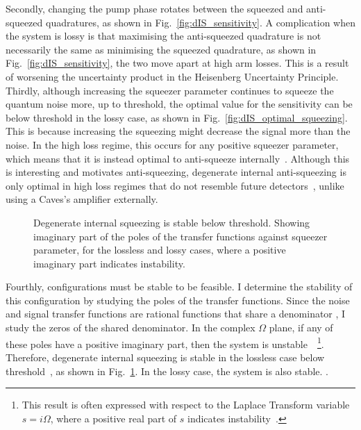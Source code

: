 Secondly, changing the pump phase rotates between the squeezed and anti-squeezed quadratures, as shown in Fig.~\ref{fig:dIS_sensitivity}. %
A complication when the system is lossy is that maximising the anti-squeezed quadrature is not necessarily the same as minimising the squeezed quadrature, as shown in Fig.~\ref{fig:dIS_sensitivity}, the two move apart at high arm losses. This is a result of worsening the uncertainty product in the Heisenberg Uncertainty Principle. 
Thirdly, although increasing the squeezer parameter continues to squeeze the quantum noise more, up to threshold, the optimal value for the sensitivity can be below threshold in the lossy case, as shown in Fig.~\ref{fig:dIS_optimal_squeezing}. This is because increasing the squeezing might decrease the signal more than the noise. In the high loss regime, this occurs for any positive squeezer parameter, which means that it is instead optimal to anti-squeeze internally~\cite{Korobko talk}. Although this is interesting and motivates anti-squeezing, degenerate internal anti-squeezing is only optimal in high loss regimes that do not resemble future detectors~\cite{}, unlike using a Caves's amplifier externally. 


\begin{figure}
	\centering
	\caption{Degenerate internal squeezing is stable below threshold. Showing imaginary part of the poles of the transfer functions against squeezer parameter, for the lossless and lossy cases, where a positive imaginary part indicates instability.}
	\label{fig:dIS_stability}
\end{figure}

Fourthly, configurations must be stable to be feasible. I determine the stability of this configuration by studying the poles of the transfer functions. Since the noise and signal transfer functions are rational functions that share a denominator , I study the zeros of the shared denominator. In the complex $\Omega$ plane, if any of these poles have a positive imaginary part, then the system is unstable~\cite{}~\footnote{This result is often expressed with respect to the Laplace Transform variable $s=i\Omega$, where a positive real part of $s$ indicates instability~\cite{}.}. %
Therefore, degenerate internal squeezing is stable in the lossless case below threshold~\cite{}, as shown in Fig.~\ref{fig:dIS_stability}. In the lossy case, the system is also stable. .


